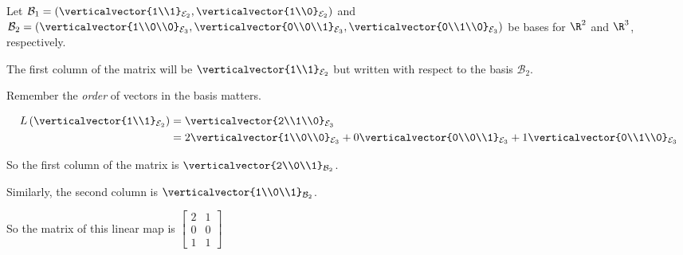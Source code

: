 \documentclass{ximera}
\begin{document}
\begin{problem}
  Let $\mathcal{B}_1 = \left(\verticalvector{1\\1}_{\mathcal{E}_2},\verticalvector{1\\0}_{\mathcal{E}_2}\right)$ and $\mathcal{B}_2 = \left(\verticalvector{1\\0\\0}_{\mathcal{E}_3},\verticalvector{0\\0\\1}_{\mathcal{E}_3},\verticalvector{0\\1\\0}_{\mathcal{E}_3}\right)$ be bases
  for $\R^2$ and $\R^3$, respectively. 

  \begin{solution}
    \begin{hint}
      The first column of the matrix will be $\verticalvector{1\\1}_{\mathcal{E}_2}$ but written with respect to the basis $\mathcal{B}_2$.

      Remember the \textit{order} of vectors in the basis matters.
    \end{hint}

    \begin{hint}
      \begin{align*}
        L\left(\verticalvector{1\\1}_{\mathcal{E}_2}\right) &= \verticalvector{2\\1\\0}_{\mathcal{E}_3}\\
        &= 2\verticalvector{1\\0\\0}_{\mathcal{E}_3}+0\verticalvector{0\\0\\1}_{\mathcal{E}_3}+1\verticalvector{0\\1\\0}_{\mathcal{E}_3}\\
      \end{align*}
    \end{hint}
    \begin{hint}
      So the first column of the matrix is $\verticalvector{2\\0\\1}_{\mathcal{B}_2}$.
    \end{hint}
    \begin{hint}
      Similarly, the second column is $\verticalvector{1\\0\\1}_{\mathcal{B}_2}$.
    \end{hint}
    \begin{hint}
      So the matrix of this linear map is \(\begin{bmatrix} 2 & 1 \\0& 0\\ 1 & 1\end{bmatrix}\)
    \end{hint}


\end{solution}
\end{problem}
\end{document}
